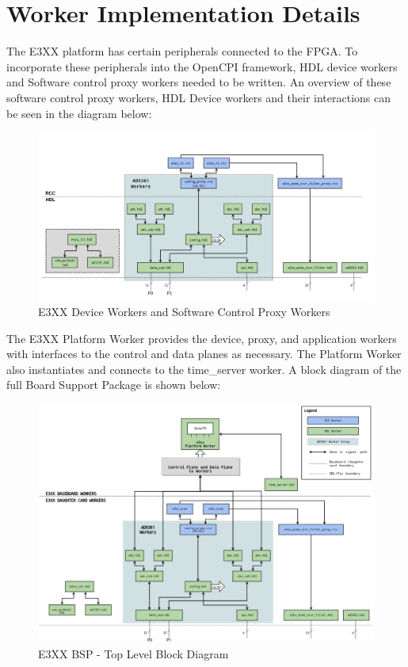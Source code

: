 \documentclass{article}
\begin{document}
\section*{Worker Implementation Details}
\begin{flushleft}
The E3XX platform has certain peripherals connected to the FPGA.  To incorporate these peripherals into the OpenCPI framework, HDL device workers and Software control proxy workers needed to be written.  An overview of these software control proxy workers, HDL Device workers and their interactions can be seen in the diagram below:
\begin{figure}[ht]
	\centerline{\includegraphics[scale=0.43]{E310_Workers}}
	\caption{E3XX Device Workers and Software Control Proxy Workers}
	\label{fig:wks}
\end{figure}

\begin{landscape}
The E3XX Platform Worker provides the device, proxy, and application workers with interfaces to the control and data planes as necessary. The Platform Worker also instantiates and connects to the time\_server worker. A block diagram of the full Board Support Package is shown below:
\begin{figure}[ht]
	\centerline{\includegraphics[scale=0.45]{E310_BSP}}
	\caption{E3XX BSP - Top Level Block Diagram}
	\label{fig:top}
\end{figure}
\end{landscape}
\end{flushleft}
\end{document}
